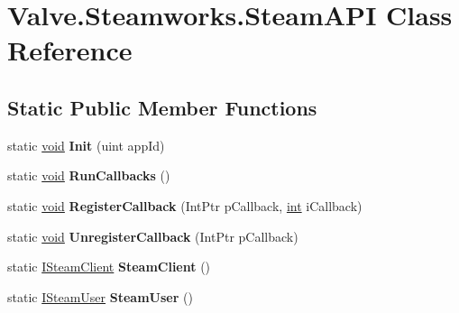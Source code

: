 \hypertarget{classValve_1_1Steamworks_1_1SteamAPI}{}\section{Valve.\+Steamworks.\+Steam\+A\+P\+I Class Reference}
\label{classValve_1_1Steamworks_1_1SteamAPI}
\subsection*{Static Public Member Functions}
\begin{DoxyCompactItemize}
\item 
\hypertarget{classValve_1_1Steamworks_1_1SteamAPI_ad8307c8bb32225555e9d040168756f09}{}static \hyperlink{SDL__audio_8h_a52835ae37c4bb905b903cbaf5d04b05f}{void} {\bfseries Init} (uint app\+Id)\label{classValve_1_1Steamworks_1_1SteamAPI_ad8307c8bb32225555e9d040168756f09}

\item 
\hypertarget{classValve_1_1Steamworks_1_1SteamAPI_aea8f6af23cb0cd9b75d845c50482db0f}{}static \hyperlink{SDL__audio_8h_a52835ae37c4bb905b903cbaf5d04b05f}{void} {\bfseries Run\+Callbacks} ()\label{classValve_1_1Steamworks_1_1SteamAPI_aea8f6af23cb0cd9b75d845c50482db0f}

\item 
\hypertarget{classValve_1_1Steamworks_1_1SteamAPI_a0eef45a91f5967a7b3526b118861a4fc}{}static \hyperlink{SDL__audio_8h_a52835ae37c4bb905b903cbaf5d04b05f}{void} {\bfseries Register\+Callback} (Int\+Ptr p\+Callback, \hyperlink{SDL__thread_8h_a6a64f9be4433e4de6e2f2f548cf3c08e}{int} i\+Callback)\label{classValve_1_1Steamworks_1_1SteamAPI_a0eef45a91f5967a7b3526b118861a4fc}

\item 
\hypertarget{classValve_1_1Steamworks_1_1SteamAPI_a1b92b87ebcdb858c2c6f9ed4c7748cf5}{}static \hyperlink{SDL__audio_8h_a52835ae37c4bb905b903cbaf5d04b05f}{void} {\bfseries Unregister\+Callback} (Int\+Ptr p\+Callback)\label{classValve_1_1Steamworks_1_1SteamAPI_a1b92b87ebcdb858c2c6f9ed4c7748cf5}

\item 
\hypertarget{classValve_1_1Steamworks_1_1SteamAPI_a24471f7d487f68c08762c26b82c38778}{}static \hyperlink{classValve_1_1Steamworks_1_1ISteamClient}{I\+Steam\+Client} {\bfseries Steam\+Client} ()\label{classValve_1_1Steamworks_1_1SteamAPI_a24471f7d487f68c08762c26b82c38778}

\item 
\hypertarget{classValve_1_1Steamworks_1_1SteamAPI_a0528500b31ab4d346daa222280cce34c}{}static \hyperlink{classValve_1_1Steamworks_1_1ISteamUser}{I\+Steam\+User} {\bfseries Steam\+User} ()\label{classValve_1_1Steamworks_1_1SteamAPI_a0528500b31ab4d346daa222280cce34c}


\end{DoxyCompactItemize}
